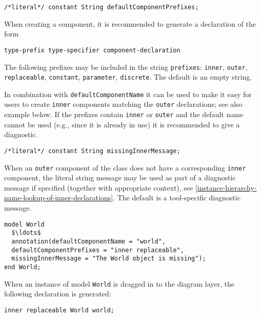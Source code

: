 \begin{lstlisting}[language=modelica]
/*literal*/ constant String defaultComponentPrefixes;
\end{lstlisting}%

When creating a component, it is recommended to generate a declaration of the form
\begin{lstlisting}[language=grammar]
type-prefix type-specifier component-declaration
\end{lstlisting}

The following prefixes may be included in the string \lstinline!prefixes!: \lstinline!inner!,
\lstinline!outer!, \lstinline!replaceable!, \lstinline!constant!, \lstinline!parameter!, \lstinline!discrete!.
The default is an empty string.

\begin{nonnormative}
In combination with \lstinline!defaultComponentName! it can be used to make it easy for users to create \lstinline!inner! components matching the \lstinline!outer! declarations; see also example below.
If the prefixes contain \lstinline!inner! or \lstinline!outer! and the default name cannot be used (e.g., since it is already in use) it is recommended to give a diagnostic.
\end{nonnormative}

\begin{lstlisting}[language=modelica]
/*literal*/ constant String missingInnerMessage;
\end{lstlisting}%

When an \lstinline!outer! component of the class does not have a corresponding \lstinline!inner!
component, the literal string message may be used as part of a diagnostic message if specified (together with appropriate context), see \cref{instance-hierarchy-name-lookup-of-inner-declarations}.
The default is a tool-specific diagnostic message.

\begin{example}
\begin{lstlisting}[language=modelica]
model World
  $\ldots$
  annotation(defaultComponentName = "world",
  defaultComponentPrefixes = "inner replaceable",
  missingInnerMessage = "The World object is missing");
end World;
\end{lstlisting}
When an instance of model \lstinline!World! is dragged in to the diagram layer, the following declaration is generated:
\begin{lstlisting}[language=modelica]
inner replaceable World world;
\end{lstlisting}
\end{example}


